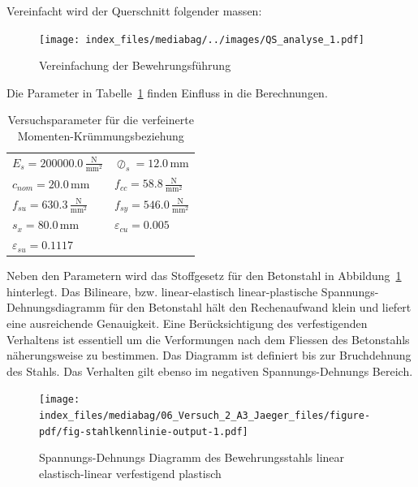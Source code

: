 \documentclass[
  letterpaper,
]{scrreprt}
\begin{document}
Vereinfacht wird der Querschnitt folgender massen:

\begin{figure}[H]

{\centering \texttt{[image: index\_files/mediabag/../images/QS\_analyse\_1.pdf]}

}

\caption{Vereinfachung der Bewehrungsführung}

\end{figure}

Die Parameter in Tabelle~\ref{tbl-params_krummung} finden Einfluss in
die Berechnungen.

\hypertarget{tbl-params_krummung}{}
\begin{longtable}[]{@{}
  >{\raggedright\arraybackslash}p{}
  >{\raggedright\arraybackslash}p{}@{}}
\caption{\label{tbl-params_krummung}Versuchsparameter für die
verfeinerte Momenten-Krümmungsbeziehung}\tabularnewline
\toprule\noalign{}
\endfirsthead
\endhead
\bottomrule\noalign{}
\endlastfoot
\(E_{s} = 200000.0 \, \frac{\text{N}}{\text{mm}^{2}}\) &
\(\oslash_{s} = 12.0 \, \text{mm}\) \\
\(c_{nom} = 20.0 \, \text{mm}\) &
\(f_{cc} = 58.8 \, \frac{\text{N}}{\text{mm}^{2}}\) \\
\(f_{su} = 630.3 \, \frac{\text{N}}{\text{mm}^{2}}\) &
\(f_{sy} = 546.0 \, \frac{\text{N}}{\text{mm}^{2}}\) \\
\(s_{x} = 80.0 \, \text{mm}\) & \(\varepsilon_{cu} = 0.005\) \\
\(\varepsilon_{su} = 0.1117\) & \\
\end{longtable}

Neben den Parametern wird das Stoffgesetz für den Betonstahl in
Abbildung~\ref{fig-stahlkennlinie} hinterlegt. Das Bilineare, bzw.
linear-elastisch linear-plastische Spannungs-Dehnungsdiagramm für den
Betonstahl hält den Rechenaufwand klein und liefert eine ausreichende
Genauigkeit. Eine Berücksichtigung des verfestigenden Verhaltens ist
essentiell um die Verformungen nach dem Fliessen des Betonstahls
näherungsweise zu bestimmen. Das Diagramm ist definiert bis zur
Bruchdehnung des Stahls. Das Verhalten gilt ebenso im negativen
Spannungs-Dehnungs Bereich.

\begin{figure}[H]

{\centering \texttt{[image: index\_files/mediabag/06\_Versuch\_2\_A3\_Jaeger\_files/figure-pdf/fig-stahlkennlinie-output-1.pdf]}

}

\caption{\label{fig-stahlkennlinie}Spannungs-Dehnungs Diagramm des
Bewehrungsstahls linear elastisch-linear verfestigend plastisch}

\end{figure}
\end{document}
